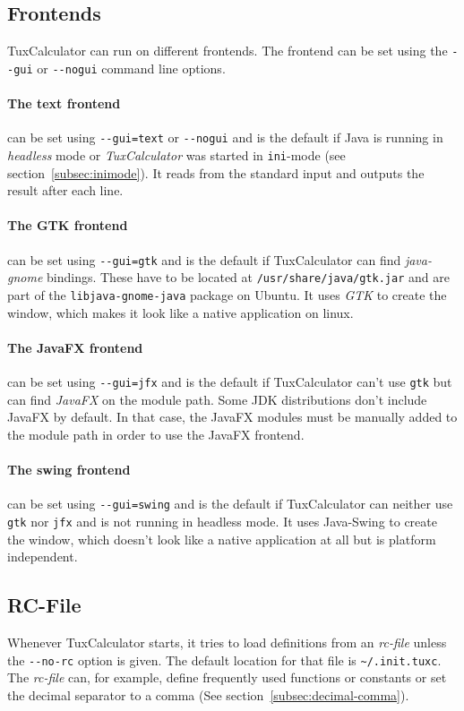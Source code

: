 \documentclass[10pt]{article}
\let\~=\allowbreak
\begin{document}
    \subsection{Frontends}\label{subsec:frontends}
    TuxCalculator can run on different frontends.
    The frontend can be set using the \verb|--gui| or \verb|--nogui| command line options.

    \paragraph{The text frontend} can be set using \verb|--gui=text| or \verb|--nogui| and is the default if Java is running in \textsl{headless} mode or \textit{TuxCalculator} was started in \verb|ini|-mode (see section~\ref{subsec:inimode}).
    It reads from the standard input and outputs the result after each line.
    
    \paragraph{The GTK frontend} can be set using \verb|--gui=gtk| and is the default if TuxCalculator can find \textsl{java-gnome} bindings.
    These have to be located at \texttt{/usr\~/share\~/java\~/gtk.jar} and are part of the \texttt{libjava-\~gnome-\~java} package on Ubuntu.
    It uses \textsl{GTK} to create the window, which makes it look like a native application on linux.
    
    \paragraph{The JavaFX frontend} can be set using \verb|--gui=jfx| and is the default if TuxCalculator can't use \verb|gtk| but can find \textsl{JavaFX} on the module path.
    Some JDK distributions don't include JavaFX by default.
    In that case, the JavaFX modules must be manually added to the module path in order to use the JavaFX frontend.
    
    \paragraph{The swing frontend} can be set using \verb|--gui=swing| and is the default if TuxCalculator can neither use \verb|gtk| nor \verb|jfx| and is not running in headless mode.
    It uses Java-Swing to create the window, which doesn't look like a native application at all but is platform independent.
    
    \subsection{RC-File}\label{subsec:rcfile}
    Whenever TuxCalculator starts, it tries to load definitions from an \textit{rc-file} unless the \verb|--no-rc| option is given.
    The default location for that file is \verb|~/.init.tuxc|.
    The \textit{rc-file} can, for example, define frequently used functions or constants or set the decimal separator to a comma (See section~\ref{subsec:decimal-comma}).
\end{document}
